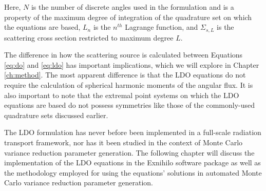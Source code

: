 \noindent Here, $N$ is the number of discrete angles used in the formulation and is
a property of the maximum degree of integration of the quadrature set on which the
equations are based, $L_n$ is the $n^{th}$ Lagrange function, and $\Sigma_{s,L}$ is 
the scattering cross section restricted to maximum degree $L$.

The difference in how the scattering source is calculated between Equations 
\ref{eq:do} and \ref{eq:ldo} has important implications, which we will explore in
Chapter \ref{ch:method}. The most apparent difference 
is that the LDO equations do not require the calculation of spherical harmonic 
moments of the angular flux. It is also important to 
note that the extremal point systems on which the LDO equations are based do not 
possess symmetries like those of the commonly-used quadrature sets discussed earlier.

The LDO formulation has never before been implemented in a full-scale radiation 
transport framework, nor has it been studied in the context of Monte Carlo variance
reduction parameter generation. The following chapter will discuss the implementation
of the LDO equations in the Exnihilo software package as well as the methodology
employed for using the equations' solutions in automated Monte Carlo variance 
reduction parameter generation.
